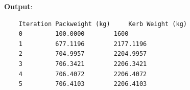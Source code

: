 \documentclass[book.tex]{subfiles}
\begin{document}
\begin{example}
\begin{marginfigure}[-10\baselineskip]
	\textbf{Output}:
	\begin{verbatim}
	Iteration Packweight (kg)     Kerb Weight (kg)
	0         100.0000        1600
	1         677.1196        2177.1196
	2         704.9957        2204.9957
	3         706.3421        2206.3421
	4         706.4072        2206.4072
	5         706.4103        2206.4103
	\end{verbatim}
\end{marginfigure}
%
%
%    
%  


\end{example}
\end{document}
